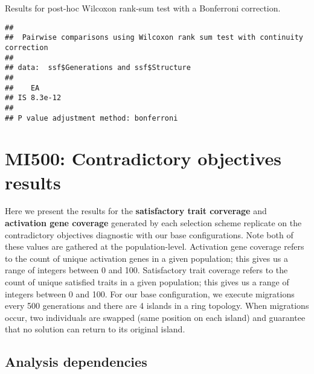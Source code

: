 \documentclass[]{book}
\newenvironment{Shaded}{\begin{snugshade}}{\end{snugshade}}
\newcommand{\DataTypeTok}[1]{\textcolor[rgb]{0.13,0.29,0.53}{#1}}
\newcommand{\KeywordTok}[1]{\textcolor[rgb]{0.13,0.29,0.53}{\textbf{#1}}}
\newcommand{\NormalTok}[1]{#1}
\newcommand{\OperatorTok}[1]{\textcolor[rgb]{0.81,0.36,0.00}{\textbf{#1}}}
\newcommand{\OtherTok}[1]{\textcolor[rgb]{0.56,0.35,0.01}{#1}}
\newcommand{\StringTok}[1]{\textcolor[rgb]{0.31,0.60,0.02}{#1}}
\begin{document}
Results for post-hoc Wilcoxon rank-sum test with a Bonferroni correction.

\begin{Shaded}
\end{Shaded}

\begin{verbatim}
## 
##  Pairwise comparisons using Wilcoxon rank sum test with continuity correction 
## 
## data:  ssf$Generations and ssf$Structure 
## 
##    EA     
## IS 8.3e-12
## 
## P value adjustment method: bonferroni
\end{verbatim}

\hypertarget{mi500-contradictory-objectives-results}{%
\chapter{MI500: Contradictory objectives results}\label{mi500-contradictory-objectives-results}}

Here we present the results for the \textbf{satisfactory trait corverage} and \textbf{activation gene coverage} generated by each selection scheme replicate on the contradictory objectives diagnostic with our base configurations.
Note both of these values are gathered at the population-level.
Activation gene coverage refers to the count of unique activation genes in a given population; this gives us a range of integers between 0 and 100.
Satisfactory trait coverage refers to the count of unique satisfied traits in a given population; this gives us a range of integers between 0 and 100.
For our base configuration, we execute migrations every 500 generations and there are 4 islands in a ring topology.
When migrations occur, two individuals are swapped (same position on each island) and guarantee that no solution can return to its original island.

\hypertarget{analysis-dependencies-2}{%
\section{Analysis dependencies}\label{analysis-dependencies-2}}
\end{document}
